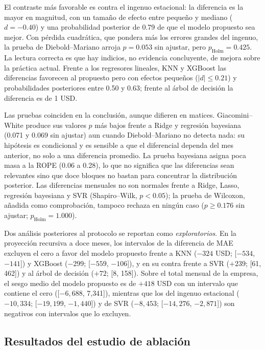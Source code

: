 \documentclass[pdflatex,sn-mathphys-num]{sn-jnl}
\begin{document}
El contraste más favorable es contra el ingenuo estacional: la diferencia es la mayor en magnitud, con un tamaño de efecto entre pequeño y mediano ($d=-0.40$) y una probabilidad posterior de 0.79 de que el modelo propuesto sea mejor. Con pérdida cuadrática, que pondera más los errores grandes del ingenuo, la prueba de Diebold--Mariano arroja $p=0.053$ sin ajustar, pero $p_{\mathrm{Holm}}=0.425$. La lectura correcta es que hay indicios, no evidencia concluyente, de mejora sobre la práctica actual. Frente a los regresores lineales, KNN y XGBoost las diferencias favorecen al propuesto pero con efectos pequeños ($\lvert d\rvert\le0.21$) y probabilidades posteriores entre 0.50 y 0.63; frente al árbol de decisión la diferencia es de 1 USD.

Las pruebas coinciden en la conclusión, aunque difieren en matices. Giacomini--White produce sus valores $p$ más bajos frente a Ridge y regresión bayesiana (0.071 y 0.069 sin ajustar) aun cuando Diebold--Mariano no detecta nada: su hipótesis es condicional y es sensible a que el diferencial dependa del mes anterior, no solo a una diferencia promedio. La prueba bayesiana asigna poca masa a la ROPE (0.06 a 0.28), lo que no significa que las diferencias sean relevantes sino que doce bloques no bastan para concentrar la distribución posterior. Las diferencias mensuales no son normales frente a Ridge, Lasso, regresión bayesiana y SVR (Shapiro--Wilk, $p<0.05$); la prueba de Wilcoxon, añadida como comprobación, tampoco rechaza en ningún caso ($p\ge0.176$ sin ajustar; $p_{\mathrm{Holm}}=1.000$).

Dos análisis posteriores al protocolo se reportan como \emph{exploratorios}. En la proyección recursiva a doce meses, los intervalos de la diferencia de MAE excluyen el cero a favor del modelo propuesto frente a KNN ($-324$ USD; [$-534$, $-141$]) y XGBoost ($-299$; [$-559$, $-106$]), y en su contra frente a SVR ($+239$; [61, 462]) y al árbol de decisión ($+72$; [8, 158]). Sobre el total mensual de la empresa, el sesgo medio del modelo propuesto es de $+418$ USD con un intervalo que contiene el cero ([$-6{,}688$, 7{,}341]), mientras que los del ingenuo estacional ($-10{,}334$; [$-19{,}199$, $-1{,}440$]) y de SVR ($-8{,}453$; [$-14{,}276$, $-2{,}871$]) son negativos con intervalos que lo excluyen.

\subsection{Resultados del estudio de ablación}\label{subsec:res_ablacion}
\end{document}
